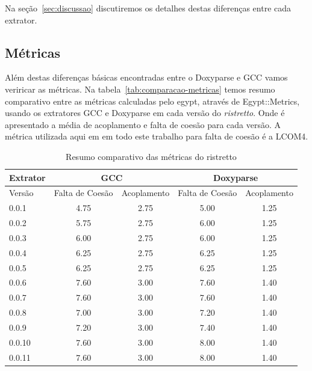 Na seção~\ref{sec:discussao} discutiremos os detalhes destas diferenças entre cada extrator.

\subsection{Métricas}

Além destas diferenças básicas encontradas entre o
Doxyparse e GCC vamos veriricar as métricas. Na tabela~\ref{tab:comparacao-metricas} temos resumo comparativo entre as
métricas calculadas pelo egypt, através de Egypt::Metrics, usando os extratores
GCC e Doxyparse em cada versão do {\it ristretto}. Onde é apresentado a média de
acoplamento e falta de coesão para cada versão. A métrica utilizada aqui em em
todo este trabalho para falta de coesão é a LCOM4.

\begin{table}
\caption{Resumo comparativo das métricas do ristretto}
\centering
\begin{tabular}{| l | c c | c c |}
\hline
Extrator  & \multicolumn{2}{|c|}{GCC}        & \multicolumn{2}{|c|}{Doxyparse} \\
\hline
Versão    & Falta de Coesão & Acoplamento    & Falta de Coesão & Acoplamento   \\
\hline
0.0.1     & 4.75            & 2.75           & 5.00            & 1.25          \\
0.0.2     & 5.75            & 2.75           & 6.00            & 1.25          \\
0.0.3     & 6.00            & 2.75           & 6.00            & 1.25          \\
0.0.4     & 6.25            & 2.75           & 6.25            & 1.25          \\
0.0.5     & 6.25            & 2.75           & 6.25            & 1.25          \\
0.0.6     & 7.60            & 3.00           & 7.60            & 1.40          \\
0.0.7     & 7.60            & 3.00           & 7.60            & 1.40          \\
0.0.8     & 7.00            & 3.00           & 7.20            & 1.40          \\
0.0.9     & 7.20            & 3.00           & 7.40            & 1.40          \\
0.0.10    & 7.60            & 3.00           & 8.00            & 1.40          \\
0.0.11    & 7.60            & 3.00           & 8.00            & 1.40          \\

\end{tabular}
\end{table}
